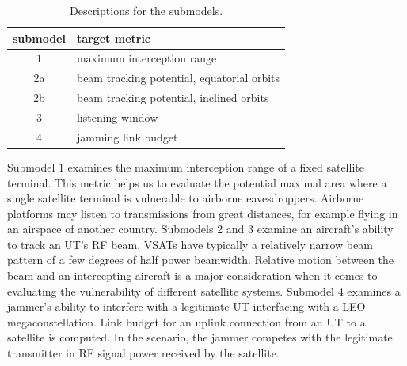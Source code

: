 \documentclass[english, 12pt, a4paper, elec, utf8, a-1b, online]{aaltothesis}
\begin{document}
\begin{table}[h]
  \centering
  \caption{Descriptions for the submodels.}
  \begin{tabular}{@{}cl@{}}
  \toprule
  \multicolumn{1}{l}{submodel}  & target metric                              \\ \midrule
  1                             & maximum interception range                 \\
  2a                            & beam tracking potential, equatorial orbits \\
  2b                            & beam tracking potential, inclined orbits   \\
  3                             & listening window                           \\
  4                             & jamming link budget                        \\ \bottomrule
  \end{tabular}
  \label{table-submodel-descriptions}
\end{table}

Submodel 1 examines the maximum interception range of a fixed satellite terminal.
This metric helps us to evaluate the potential maximal area where a single satellite terminal is vulnerable to airborne eavesdroppers.
Airborne platforms may listen to transmissions from great distances, for example flying in an airspace of another country.
Submodels 2 and 3 examine an aircraft's ability to track an UT's RF beam.
VSATs have typically a relatively narrow beam pattern of a few degrees of half power beamwidth.
Relative motion between the beam and an intercepting aircraft is a major consideration when it comes to evaluating the vulnerability of different satellite systems.
Submodel 4 examines a jammer's ability to interfere with a legitimate UT interfacing with a LEO megaconstellation.
Link budget for an uplink connection from an UT to a satellite is computed.
In the scenario, the jammer competes with the legitimate transmitter in RF signal power received by the satellite.
\end{document}
